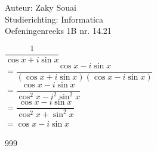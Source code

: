 \documentclass[a4paper]{article}
\begin{document}
\noindent \large Auteur: Zaky Souai \\
\noindent \large Studierichting: Informatica\\
\noindent \large Oefeningenreeks 1B nr. 14.21\\

\medskip

\normalsize
	$\dfrac{1}{\cos x + i\sin x} $ \\
    
    $ = \dfrac{\cos x - i\sin x}{(\cos x  + i\sin x )(\cos x - i\sin x ) } $ \\
    
    $ = \dfrac{\cos x - i\sin x}{\cos^2 x - i^2\sin^2 x} $ \\ 
    
    $ = \dfrac{\cos x - i\sin x}{\cos^2 x + \sin^2 x} $ \\ 

    $ = \cos x - i\sin x $ \\ 
\begin{thebibliography}{999}
\end{thebibliography}
\end{document}
